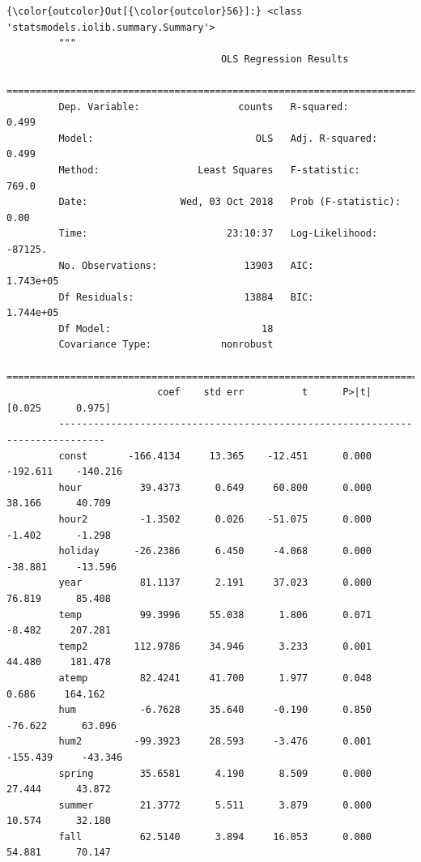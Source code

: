 \documentclass[11pt]{article}
\begin{document}
    
\begin{Verbatim}[commandchars=\\\{\}]
{\color{outcolor}Out[{\color{outcolor}56}]:} <class 'statsmodels.iolib.summary.Summary'>
         """
                                     OLS Regression Results                            
         ==============================================================================
         Dep. Variable:                 counts   R-squared:                       0.499
         Model:                            OLS   Adj. R-squared:                  0.499
         Method:                 Least Squares   F-statistic:                     769.0
         Date:                Wed, 03 Oct 2018   Prob (F-statistic):               0.00
         Time:                        23:10:37   Log-Likelihood:                -87125.
         No. Observations:               13903   AIC:                         1.743e+05
         Df Residuals:                   13884   BIC:                         1.744e+05
         Df Model:                          18                                         
         Covariance Type:            nonrobust                                         
         ==============================================================================
                          coef    std err          t      P>|t|      [0.025      0.975]
         ------------------------------------------------------------------------------
         const       -166.4134     13.365    -12.451      0.000    -192.611    -140.216
         hour          39.4373      0.649     60.800      0.000      38.166      40.709
         hour2         -1.3502      0.026    -51.075      0.000      -1.402      -1.298
         holiday      -26.2386      6.450     -4.068      0.000     -38.881     -13.596
         year          81.1137      2.191     37.023      0.000      76.819      85.408
         temp          99.3996     55.038      1.806      0.071      -8.482     207.281
         temp2        112.9786     34.946      3.233      0.001      44.480     181.478
         atemp         82.4241     41.700      1.977      0.048       0.686     164.162
         hum           -6.7628     35.640     -0.190      0.850     -76.622      63.096
         hum2         -99.3923     28.593     -3.476      0.001    -155.439     -43.346
         spring        35.6581      4.190      8.509      0.000      27.444      43.872
         summer        21.3772      5.511      3.879      0.000      10.574      32.180
         fall          62.5140      3.894     16.053      0.000      54.881      70.147

\end{Verbatim}
\end{document}
